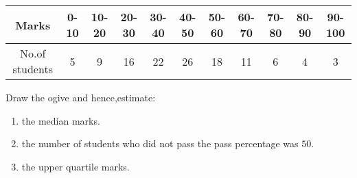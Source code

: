 \begin{enumerate}
\begin{table}[h!]
    \centering
    \small  %
    \begin{tabular}{|c|c|c|c|c|c|c|c|c|c|c|}
        \hline
        Marks  & 0-10 & 10-20 & 20-30 & 30-40 & 40-50 & 50-60 & 60-70 & 70-80 & 80-90 & 90-100\\
        \hline
        No.of students &5&9&16&22&26&18&11&6&4&3\\
        \hline
    \end{tabular}
\end{table} 
		
       \text Draw the ogive and hence,estimate:
       \begin{enumerate}
           \item the median marks.
           \item the number of students who did not pass the pass percentage was $50$.
           \item the upper quartile marks.
       \end{enumerate}
		
\end{enumerate}
